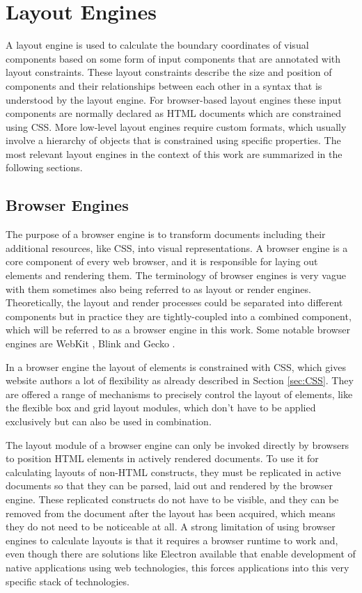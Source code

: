 \section{Layout Engines}

A layout engine is used to calculate the boundary coordinates of visual components based on some form of input components that are annotated with layout constraints. These layout constraints describe the size and position of components and their relationships between each other in a syntax that is understood by the layout engine. For browser-based layout engines these input components are normally declared as HTML documents which are constrained using CSS. More low-level layout engines require custom formats, which usually involve a hierarchy of objects that is constrained using specific properties. The most relevant layout engines in the context of this work are summarized in the following sections.

\subsection{Browser Engines}

The purpose of a browser engine is to transform documents including their additional resources, like CSS, into visual representations. A browser engine is a core component of every web browser, and it is responsible for laying out elements and rendering them. The terminology of browser engines is very vague with them sometimes also being referred to as layout or render engines. Theoretically, the layout and render processes could be separated into different components but in practice they are tightly-coupled into a combined component, which will be referred to as a browser engine in this work. Some notable browser engines are WebKit \parencite{WebKit}, Blink \parencite{Blink} and Gecko \parencite{Gecko}.

In a browser engine the layout of elements is constrained with CSS, which gives website authors a lot of flexibility as already described in Section \ref{sec:CSS}. They are offered a range of mechanisms to precisely control the layout of elements, like the flexible box and grid layout modules, which don't have to be applied exclusively but can also be used in combination. 

The layout module of a browser engine can only be invoked directly by browsers to position HTML elements in actively rendered documents. To use it for calculating layouts of non-HTML constructs, they must be replicated in active documents so that they can be parsed, laid out and rendered by the browser engine. These replicated constructs do not have to be visible, and they can be removed from the document after the layout has been acquired, which means they do not need to be noticeable at all. A strong limitation of using browser engines to calculate layouts is that it requires a browser runtime to work and, even though there are solutions like Electron available that enable development of native applications using web technologies, this forces applications into this very specific stack of technologies. 

